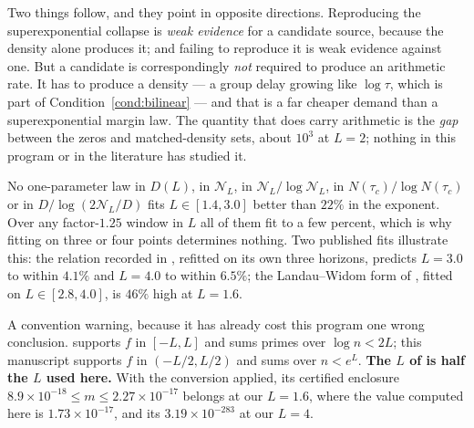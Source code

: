 \begin{remark}\label{rem:mechanism}
Two things follow, and they point in opposite directions.
Reproducing the superexponential collapse is \emph{weak evidence} for a candidate
source, because the density alone produces it; and failing to reproduce it is weak
evidence against one. But a candidate is correspondingly \emph{not} required to
produce an arithmetic rate. It has to produce a density --- a group delay growing
like $\log\tau$, which is part of Condition~\ref{cond:bilinear} --- and that is a far cheaper
demand than a superexponential margin law. The quantity that does carry arithmetic
is the \emph{gap} between the zeros and matched-density sets, about $10^3$ at
$L=2$; nothing in this program or in the literature has studied it.
\end{remark}

\begin{remark}\label{rem:laws}
No one-parameter law in $D(L)$, in $\mathcal N_L$, in $\mathcal N_L/\log\mathcal N_L$,
in $N(\tau_c)/\log N(\tau_c)$ or in $D/\log(2\mathcal N_L/D)$ fits
$L\in[1.4,3.0]$ better than $22\%$ in the exponent. Over any factor-$1.25$ window
in $L$ all of them fit to a few percent, which is why fitting on three or four
points determines nothing. Two published fits illustrate this: the relation
recorded in \cite{CriticalPath}, refitted on its own three horizons, predicts
$L=3.0$ to within $4.1\%$ and $L=4.0$ to within $6.5\%$; the Landau--Widom form of
\cite{ZhuCompact}, fitted on $L\in[2.8,4.0]$, is $46\%$ high at $L=1.6$.

A convention warning, because it has already cost this program one wrong
conclusion. \cite{ZhuCompact} supports $f$ in $[-L,L]$ and sums primes over
$\log n<2L$; this manuscript supports $f$ in $(-L/2,L/2)$ and sums over $n<e^L$.
\textbf{The $L$ of \cite{ZhuCompact} is half the $L$ used here.} With the
conversion applied, its certified enclosure $8.9\times10^{-18}\leq m\leq
2.27\times10^{-17}$ belongs at our $L=1.6$, where the value computed here is
$1.73\times10^{-17}$, and its $3.19\times10^{-283}$ at our $L=4$.
\end{remark}

